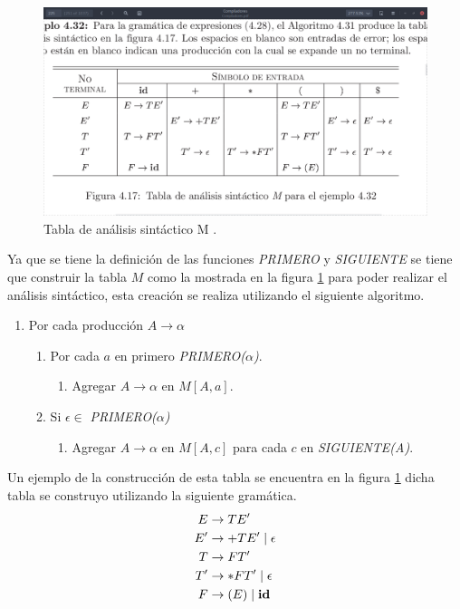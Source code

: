 \documentclass[12pt, titlepage]{article}
\begin{document}
\begin{figure}[H]
        \begin{center}
            \includegraphics[width=15cm]{tabla.png}
            \caption{Tabla de análisis sintáctico M \cite{compis}.}
            \label{fig:tabla}
        \end{center}
\end{figure}
Ya que se tiene la definición de las funciones \emph{PRIMERO} y 
\emph{SIGUIENTE} se tiene que construir la tabla $M$ como la mostrada en la 
figura \ref{fig:tabla} para poder realizar el análisis sintáctico, esta creación 
se realiza utilizando el siguiente algoritmo. \cite{compis}
\begin{enumerate}
 \item Por cada producción $A \rightarrow \alpha$
 \begin{enumerate}
  \item Por cada $a$ en primero \emph{PRIMERO($\alpha$)}.
  \begin{enumerate}
   \item Agregar $A \rightarrow \alpha$ en $M\left[A, a \right] $.
  \end{enumerate}
  \item Si $\epsilon \in $ \emph{PRIMERO($\alpha$)}
  \begin{enumerate}
   \item Agregar $A \rightarrow \alpha$ en $M\left[A, c \right] $ para cada $c$ 
en \emph{SIGUIENTE(A)}.
  \end{enumerate}
 \end{enumerate}
\end{enumerate}
Un ejemplo de la construcción de esta tabla se encuentra en la figura 
\ref{fig:tabla} dicha tabla se construyo utilizando la siguiente gramática.
    \begin{align*}
        E &\rightarrow TE' \\
        E' &\rightarrow +TE' \mid \epsilon \\
        T &\rightarrow FT' \\
        T' &\rightarrow *FT' \mid \epsilon \\
        F &\rightarrow (E) \mid \text{\textbf{id}}\\
    \end{align*}
    \newpage
\end{document}
